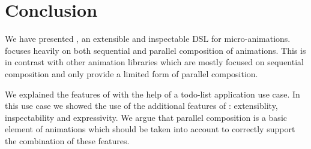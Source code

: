 \section{Conclusion}
\label{sec:conclusion}

We have presented \dsl{}, an extensible and inspectable DSL for micro-animations. \dsl{} focuses heavily on both sequential and parallel composition of animations. This is in contrast with other animation libraries which are mostly focused on sequential composition and only provide a limited form of parallel composition.

We explained the features of \dsl{} with the help of a todo-list application use case. In this use case we showed the use of the additional features of \dsl{}: extensiblity, inspectability and expressivity. We argue that parallel composition is a basic element of animations which should be taken into account to correctly support the combination of these features.

